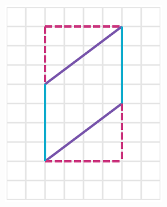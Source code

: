 \begin{solutionbox}{14cm}
    \begin{minipage}{0.4\textwidth}
        \begin{multicols}{2}
            \begin{figure}[H]
                \centering
                \includegraphics[width=0.9\linewidth]{../images/peri_paralelogramo_01a.png}
                \caption{}
                \label{fig:peri_paralelogramo_01a}
            \end{figure}
            \begin{figure}[H]
                \centering

\end{figure}
\end{multicols}
\end{minipage}
\end{solutionbox}

